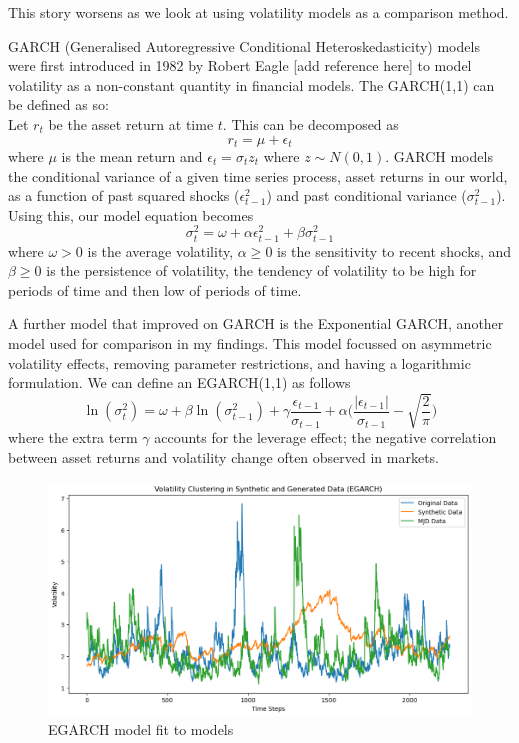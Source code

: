 \documentclass[12pt]{article}
\newcommand{\newp}
    {
    \vskip 0.5cm 
  }
\numberwithin{equation}{section}
\begin{document}
This story worsens as we look at using volatility models as a comparison method. 
\newp
GARCH (Generalised Autoregressive Conditional Heteroskedasticity) models were 
first introduced in 1982 by Robert Eagle [add reference here] to model volatility 
as a non-constant quantity in financial models. The GARCH(1,1) can be defined as 
so:\\ 
Let $r_t$ be the asset return at time $t$. This can be decomposed as 
\begin{equation}
r_t = \mu + \epsilon_t
\end{equation}
where $\mu$ is the mean return and $\epsilon_t = \sigma_t z_t$ where $z \sim N(0,1)$. 
GARCH models the conditional variance of a given time series process, asset returns in 
our world, as a function of past squared shocks ($\epsilon^2_{t-1}$) and past 
conditional variance ($\sigma^2_{t-1}$). Using this, our model equation becomes
\begin{equation}
  \sigma^2_t = \omega + \alpha\epsilon^2_{t-1} + \beta\sigma^2_{t-1}
\end{equation}
where $\omega > 0$ is the average volatility, $\alpha \geq 0$ is the sensitivity 
to recent shocks, and $\beta \geq0$ is the persistence of volatility, the tendency
of volatility to be high for periods of time and then low of periods of time. 
\newp 
A further model that improved on GARCH is the Exponential GARCH, another model used 
for comparison in my findings. This model focussed on asymmetric volatility 
effects, removing parameter restrictions, and having a logarithmic formulation. 
We can define an EGARCH(1,1) as follows 
\begin{equation}
  \ln(\sigma^2_t) = \omega +\beta\ln(\sigma^2_{t-1})+\gamma\frac{\epsilon_{t-1}}
  {\sigma_{t-1}} + \alpha\Biggl(\frac{|\epsilon_{t-1}|}{\sigma_{t-1}}-\sqrt{\frac{2}{\pi}}\Biggr)
\end{equation}
where the extra term $\gamma$ accounts for the leverage effect; the 
negative correlation between asset returns and volatility change often 
observed in markets.
\newp 
\begin{figure}[h!]
  \centering 
  \includegraphics[scale=0.4]{egarch2.png}
  \caption{EGARCH model fit to models}
  \label{fig:egarch2}
\end{figure}
\end{document}
